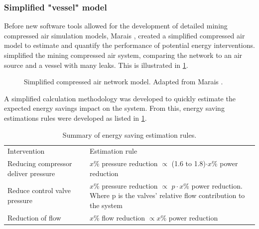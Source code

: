 \subsubsection{Simplified "vessel" model}
Before new software tools allowed for the development of detailed mining compressed air simulation models, Marais \cite{Marais2012PhD}, \cite{marais2013simplification} created a simplified compressed air model to estimate and quantify the performance of potential energy interventions. \cite{Marais2012PhD} simplified the mining compressed air system, comparing the network to an air source and a vessel with many leaks. This is illustrated in \cref{fig:Marais vessel model}.
\begin{figure}[h!]
	\centering
	\caption[Simplified compressed air netowrk model.]{Simplified compressed air network model. Adapted from Marais \cite{Marais2012PhD}.}
	\label{fig:Marais vessel model}
\end{figure}
\par 
A simplified calculation methodology was developed to quickly estimate the expected energy savings impact on the system. From this, energy saving estimations rules were developed as listed in \cref{table: Rules of thumb}. 
\par 
\begin{table}[h]
	\centering
	\begin{tabular}{p{}p{}p{}}
		\hline
		Intervention && Estimation rule\\
		\hhline{===} 
		Reducing compressor deliver pressure & & $x \%$ pressure reduction $\propto$ (1.6 to 1.8)$\cdot x\%$ power reduction \newline \\
		Reduce control valve pressure & &$x \%$ pressure reduction $\propto$ $p\cdot x\%$ power reduction. \newline \newline Where p is the valves' relative flow contribution to the system \newline \\
		Reduction of flow && $x \%$ flow reduction $\propto x \%$ power reduction \newline\\
		\hline
	\end{tabular} 
	\caption[Summary of energy saving estimation rules]{Summary of energy saving estimation rules\cite{Marais2012PhD}.}
	\label{table: Rules of thumb}
\end{table}
